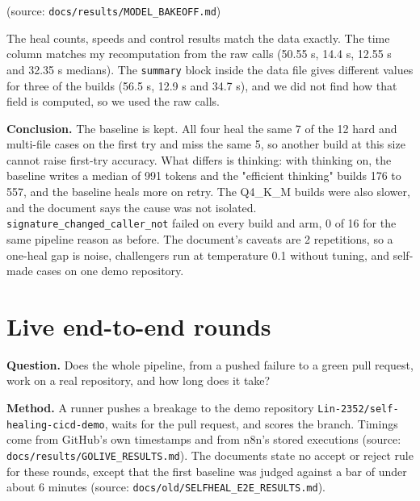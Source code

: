 (source: \texttt{docs/\allowbreak{}results/\allowbreak{}MODEL\_\allowbreak{}BAKEOFF.\allowbreak{}md})

The heal counts, speeds and control results match the data exactly. The time column matches my recomputation from the raw calls (50.55 s, 14.4 s, 12.55 s and 32.35 s medians). The \texttt{summary} block inside the data file gives different values for three of the builds (56.5 s, 12.9 s and 34.7 s), and we did not find how that field is computed, so we used the raw calls.

\textbf{Conclusion.} The baseline is kept. All four heal the same 7 of the 12 hard and multi-file cases on the first try and miss the same 5, so another build at this size cannot raise first-try accuracy. What differs is thinking: with thinking on, the baseline writes a median of 991 tokens and the "efficient thinking" builds 176 to 557, and the baseline heals more on retry. The Q4\_\allowbreak{}K\_\allowbreak{}M builds were also slower, and the document says the cause was not isolated. \texttt{signature\_\allowbreak{}changed\_\allowbreak{}caller\_\allowbreak{}not} failed on every build and arm, 0 of 16 for the same pipeline reason as before. The document's caveats are 2 repetitions, so a one-heal gap is noise, challengers run at temperature 0.1 without tuning, and self-made cases on one demo repository.

\section{Live end-to-end rounds}

\textbf{Question.} Does the whole pipeline, from a pushed failure to a green pull request, work on a real repository, and how long does it take?

\textbf{Method.} A runner pushes a breakage to the demo repository \texttt{Lin-\allowbreak{}2352/\allowbreak{}self-\allowbreak{}healing-\allowbreak{}cicd-\allowbreak{}demo}, waits for the pull request, and scores the branch. Timings come from GitHub's own timestamps and from n8n's stored executions (source: \texttt{docs/\allowbreak{}results/\allowbreak{}GOLIVE\_\allowbreak{}RESULTS.\allowbreak{}md}). The documents state no accept or reject rule for these rounds, except that the first baseline was judged against a bar of under about 6 minutes (source: \texttt{docs/\allowbreak{}old/\allowbreak{}SELFHEAL\_\allowbreak{}E2E\_\allowbreak{}RESULTS.\allowbreak{}md}).


